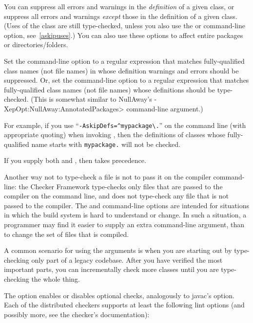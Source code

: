 You can suppress all errors and warnings in the \emph{definition} of a given
class, or suppress all errors and warnings \emph{except} those in the definition
of a given class.  (Uses of the class are still type-checked, unless you also use
the  or  command-line option,
see~\ref{askipuses}.)
You can also use these options to affect entire packages or directories/folders.

Set the  command-line option to a
regular expression that matches fully-qualified class names (not file names) in whose definition warnings and errors
should be suppressed.
Or, set the  command-line option to a
regular expression that matches fully-qualified class names (not file names) whose
definitions should be type-checked.
(This is somewhat similar to NullAway's
\<-XepOpt:NullAway:AnnotatedPackages> command-line argument.)

For example, if you use
``{\codesize\verb|-AskipDefs=^mypackage\.|}'' on the command line
(with appropriate quoting) when invoking
, then the definitions of
classes whose fully-qualified name starts with \codesize\verb|mypackage.|
will not be checked.

If you supply both  and , then
 takes precedence.

Another way not to type-check a file is not to pass it on the compiler
command-line:  the Checker Framework type-checks only files that are passed
to the compiler on the command line, and does not type-check any file that
is not passed to the compiler.  The  and 
command-line options
are intended for situations in which the build system is hard to understand
or change.  In such a situation, a programmer may find it easier to supply
an extra command-line argument, than to change the set of files that is
compiled.

A common scenario for using the arguments is when you are starting out by
type-checking only part of a legacy codebase.  After you have verified the
most important parts, you can incrementally check more classes until you
are type-checking the whole thing.



The  option enables or disables optional checks, analogously to
javac's  option.
Each of the distributed checkers supports at least the following lint
options (and possibly more, see the checker's documentation):

